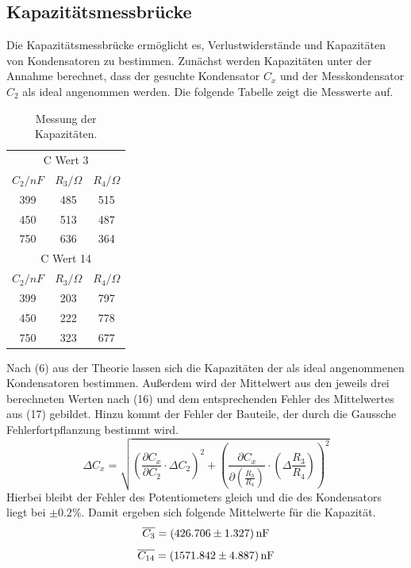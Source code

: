 \subsection{Kapazitätsmessbrücke}
Die Kapazitätsmessbrücke ermöglicht es, Verlustwiderstände und Kapazitäten von Kondensatoren zu bestimmen.
Zunächst werden Kapazitäten unter der Annahme berechnet, dass der gesuchte Kondensator $C_x$ und der Messkondensator $C_2$ als ideal angenommen werden.
Die folgende Tabelle zeigt die Messwerte auf.

\begin{table}[h!]
    \begin{center}
      \caption{Messung der Kapazitäten.}
      \label{tab:Tabelle 2}
      \begin{tabular}{c|c|c} 
        \multicolumn{3}{c}{C Wert 3} \\
        \textbf{$C_2 / nF$ } & \textbf{$R_3 / \Omega$} & \textbf{$R_4 / \Omega$}\\
        \hline
        399 & 485 & 515\\
        450 & 513 & 487\\
        750 & 636 & 364\\
        \multicolumn{3}{c}{C Wert 14} \\
        \textbf{$C_2 / nF$ } & \textbf{$R_3 / \Omega$} & \textbf{$R_4 / \Omega$}\\
        \hline
        399 & 203 & 797\\
        450 & 222 & 778\\
        750 & 323 & 677\\
      \end{tabular}
    \end{center}
\end{table}
Nach (6) aus der Theorie lassen sich die Kapazitäten der als ideal angenommenen Kondensatoren bestimmen.
Außerdem wird der Mittelwert aus den jeweils drei berechneten Werten nach (16) und dem entsprechenden Fehler des Mittelwertes aus (17) gebildet.
Hinzu kommt der Fehler der Bauteile, der durch die Gaussche Fehlerfortpflanzung bestimmt wird.
\begin{equation}
    \Delta C_x = \sqrt{\left (\frac{\partial C_x}{\partial C_2}\cdot \Delta C_2 \right )^2 + \left (\frac{\partial C_x}{\partial \left (\frac{R_3}{R_4}\right )} \cdot \left (\Delta \frac{R_3}{R_4}\right )\right )^2}
\end{equation}
Hierbei bleibt der Fehler des Potentiometers gleich und die des Kondensators liegt bei $\pm 0.2 \%$.
Damit ergeben sich folgende Mittelwerte für die Kapazität.
\begin{equation}
    \overline{C_\text{3}} = \SI{426,706 \pm 1,327}{nF} \notag 
\end{equation}
\begin{equation}
    \overline{C_\text{14}} = \SI{1571,842 \pm 4,887}{nF} \notag 
\end{equation}


